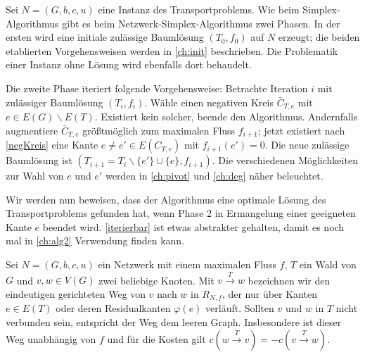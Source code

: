 Sei $N=(G,b,c,u)$ eine Instanz des Transportproblems. Wie beim Simplex-Algorithmus gibt es beim Netzwerk-Simplex-Algorithmus zwei Phasen. In der ersten wird eine initiale zulässige Baumlösung $(T_0,f_0)$ auf $N$ erzeugt; die beiden etablierten Vorgehensweisen werden in \cref{ch:init} beschrieben. Die Problematik einer Instanz ohne Lösung wird ebenfalls dort behandelt.

Die zweite Phase iteriert folgende Vorgehensweise: Betrachte Iteration $i$ mit zulässiger Baumlösung $(T_i,f_i)$. Wähle einen negativen Kreis $\bar{C}_{T,e}$ mit $e\in E(G)\backslash E(T)$. Existiert kein solcher, beende den Algorithmus. Andernfalls augmentiere $\bar{C}_{T,e}$ größtmöglich zum maximalen Fluss $f_{i+1}$; jetzt existiert nach \cref{negKreis} eine Kante $e\neq e'\in E(C_{T,e})$ mit $f_{i+1}(e')=0$. Die neue zulässige Baumlösung ist $(T_{i+1}=T_i\backslash\{e'\}\cup\{e\},f_{i+1})$. Die verschiedenen Möglichkeiten zur Wahl von $e$ und $e'$ werden in \cref{ch:pivot} und \cref{ch:deg} näher beleuchtet.

Wir werden nun beweisen, dass der Algorithmus eine optimale Lösung des Transportproblems gefunden hat, wenn Phase 2 in Ermangelung einer geeigneten Kante $e$ beendet wird. \cref{iterierbar} ist etwas abstrakter gehalten, damit es noch mal in \cref{ch:alg2} Verwendung finden kann.

\begin{nota}Sei $N=(G,b,c,u)$ ein Netzwerk mit einem maximalen Fluss $f$, $T$ ein Wald von $G$ und $v,w\in V(G)$ zwei beliebige Knoten. Mit $v\xrightarrow{T}w$ bezeichnen wir den eindeutigen gerichteten Weg von $v$ nach $w$ in $R_{N,f}$, der nur über Kanten $e\in E(T)$ oder deren Residualkanten $\varphi(e)$ verläuft. Sollten $v$ und $w$ in $T$ nicht verbunden sein, entspricht der Weg dem leeren Graph. Insbesondere ist dieser Weg unabhängig von $f$ und für die Kosten gilt $c(w\xrightarrow{T}v) = -c(v\xrightarrow{T}w)$.\end{nota}

